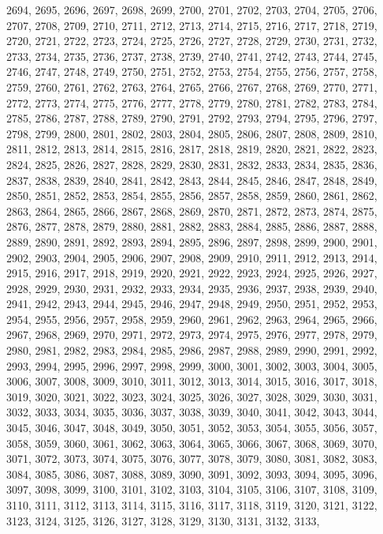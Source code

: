 \documentclass[a4paper,11pt]{article}
\begin{document}
2694, 2695, 2696, 2697, 2698, 2699, 2700, 2701, 2702, 2703, 2704,
2705, 2706, 2707, 2708, 2709, 2710, 2711, 2712, 2713, 2714, 2715,
2716, 2717, 2718, 2719, 2720, 2721, 2722, 2723, 2724, 2725, 2726,
2727, 2728, 2729, 2730, 2731, 2732, 2733, 2734, 2735, 2736, 2737,
2738, 2739, 2740, 2741, 2742, 2743, 2744, 2745, 2746, 2747, 2748,
2749, 2750, 2751, 2752, 2753, 2754, 2755, 2756, 2757, 2758, 2759,
2760, 2761, 2762, 2763, 2764, 2765, 2766, 2767, 2768, 2769, 2770,
2771, 2772, 2773, 2774, 2775, 2776, 2777, 2778, 2779, 2780, 2781,
2782, 2783, 2784, 2785, 2786, 2787, 2788, 2789, 2790, 2791, 2792,
2793, 2794, 2795, 2796, 2797, 2798, 2799, 2800, 2801, 2802, 2803,
2804, 2805, 2806, 2807, 2808, 2809, 2810, 2811, 2812, 2813, 2814,
2815, 2816, 2817, 2818, 2819, 2820, 2821, 2822, 2823, 2824, 2825,
2826, 2827, 2828, 2829, 2830, 2831, 2832, 2833, 2834, 2835, 2836,
2837, 2838, 2839, 2840, 2841, 2842, 2843, 2844, 2845, 2846, 2847,
2848, 2849, 2850, 2851, 2852, 2853, 2854, 2855, 2856, 2857, 2858,
2859, 2860, 2861, 2862, 2863, 2864, 2865, 2866, 2867, 2868, 2869,
2870, 2871, 2872, 2873, 2874, 2875, 2876, 2877, 2878, 2879, 2880,
2881, 2882, 2883, 2884, 2885, 2886, 2887, 2888, 2889, 2890, 2891,
2892, 2893, 2894, 2895, 2896, 2897, 2898, 2899, 2900, 2901, 2902,
2903, 2904, 2905, 2906, 2907, 2908, 2909, 2910, 2911, 2912, 2913,
2914, 2915, 2916, 2917, 2918, 2919, 2920, 2921, 2922, 2923, 2924,
2925, 2926, 2927, 2928, 2929, 2930, 2931, 2932, 2933, 2934, 2935,
2936, 2937, 2938, 2939, 2940, 2941, 2942, 2943, 2944, 2945, 2946,
2947, 2948, 2949, 2950, 2951, 2952, 2953, 2954, 2955, 2956, 2957,
2958, 2959, 2960, 2961, 2962, 2963, 2964, 2965, 2966, 2967, 2968,
2969, 2970, 2971, 2972, 2973, 2974, 2975, 2976, 2977, 2978, 2979,
2980, 2981, 2982, 2983, 2984, 2985, 2986, 2987, 2988, 2989, 2990,
2991, 2992, 2993, 2994, 2995, 2996, 2997, 2998, 2999, 3000, 3001,
3002, 3003, 3004, 3005, 3006, 3007, 3008, 3009, 3010, 3011, 3012,
3013, 3014, 3015, 3016, 3017, 3018, 3019, 3020, 3021, 3022, 3023,
3024, 3025, 3026, 3027, 3028, 3029, 3030, 3031, 3032, 3033, 3034,
3035, 3036, 3037, 3038, 3039, 3040, 3041, 3042, 3043, 3044, 3045,
3046, 3047, 3048, 3049, 3050, 3051, 3052, 3053, 3054, 3055, 3056,
3057, 3058, 3059, 3060, 3061, 3062, 3063, 3064, 3065, 3066, 3067,
3068, 3069, 3070, 3071, 3072, 3073, 3074, 3075, 3076, 3077, 3078,
3079, 3080, 3081, 3082, 3083, 3084, 3085, 3086, 3087, 3088, 3089,
3090, 3091, 3092, 3093, 3094, 3095, 3096, 3097, 3098, 3099, 3100,
3101, 3102, 3103, 3104, 3105, 3106, 3107, 3108, 3109, 3110, 3111,
3112, 3113, 3114, 3115, 3116, 3117, 3118, 3119, 3120, 3121, 3122,
3123, 3124, 3125, 3126, 3127, 3128, 3129, 3130, 3131, 3132, 3133,
\end{document}
